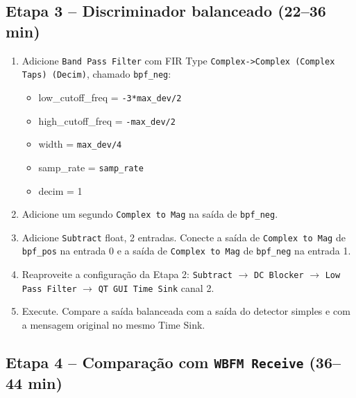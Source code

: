 \documentclass[11pt,a4paper]{article}
\begin{document}
\subsection*{Etapa 3 -- Discriminador balanceado (22--36 min)}

\begin{instrucao}
\begin{enumerate}[label=\arabic*.]
  \item Adicione \texttt{Band Pass Filter} com FIR Type
    \texttt{Complex->Complex (Complex Taps) (Decim)}, chamado \texttt{bpf\_neg}:
    \begin{itemize}
      \item low\_cutoff\_freq = \texttt{-3*max\_dev/2}
      \item high\_cutoff\_freq = \texttt{-max\_dev/2}
      \item width = \texttt{max\_dev/4}
      \item samp\_rate = \texttt{samp\_rate}
      \item decim = 1
    \end{itemize}
  \item Adicione um segundo \texttt{Complex to Mag} na saída de
    \texttt{bpf\_neg}.
  \item Adicione \texttt{Subtract} float, 2 entradas. Conecte a saída de
    \texttt{Complex to Mag} de \texttt{bpf\_pos} na entrada 0 e a saída
    de \texttt{Complex to Mag} de \texttt{bpf\_neg} na entrada 1.
  \item Reaproveite a configuração da Etapa 2: \texttt{Subtract} $\to$
    \texttt{DC Blocker} $\to$ \texttt{Low Pass Filter} $\to$
    \texttt{QT GUI Time Sink} canal 2.
  \item Execute. Compare a saída balanceada com a saída do detector simples
    e com a mensagem original no mesmo Time Sink.
\end{enumerate}
\end{instrucao}

\subsection*{Etapa 4 -- Comparação com \texttt{WBFM Receive} (36--44 min)}
\end{document}

